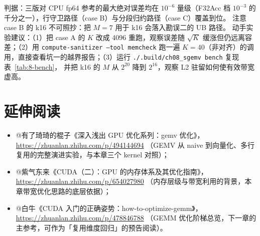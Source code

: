 判据：三版对 CPU fp64 参考的最大绝对误差均在 $10^{-6}$ 量级（F32Acc 档
$10^{-3}$ 的千分之一），行守卫路径（case B）与分段归约路径（case C）覆盖到位。
注意 case B 的 k16 不可照抄：把 $M{=}7$ 用于 k16 会落入勘误二的 UB 路径。
动手实验建议：（1）把 case A 的 $K$ 改成 4096 重跑，观察误差随 $\sqrt{K}$
缓涨但仍远离容差；（2）用 \texttt{compute-sanitizer --tool memcheck} 跑一遍
$K = 40$（非对齐）的调用，直接查看坑一的越界报告；（3）运行
\texttt{.\allowbreak{}/\allowbreak{}.\allowbreak{}build/\allowbreak{}ch08\_\allowbreak{}sgemv bench} 复现表~\ref{tab:8-bench}，
并把 k16 的 $M$ 从 $2^{20}$ 降到 $2^{16}$，观察 L2 驻留如何使有效带宽虚高。

\section*{延伸阅读}

\begin{itemize}
  \item @有了琦琦的棍子《深入浅出 GPU 优化系列：gemv 优化》，
        \url{https://zhuanlan.zhihu.com/p/494144694}
        （GEMV 从 naive 到向量化、多行复用的完整演进实验，与本章三个 kernel 对照）；
  \item @紫气东来《CUDA（二）：GPU 的内存体系及其优化指南》，
        \url{https://zhuanlan.zhihu.com/p/654027980}
        （内存层级与带宽利用的背景，本章带宽优化思路的底层依据）；
  \item @白牛《CUDA 入门的正确姿势：how-to-optimize-gemm》，
        \url{https://zhuanlan.zhihu.com/p/478846788}
        （GEMM 优化阶梯总览，下一章的主参考，可作为「复用维度回归」的预告阅读）。
\end{itemize}
